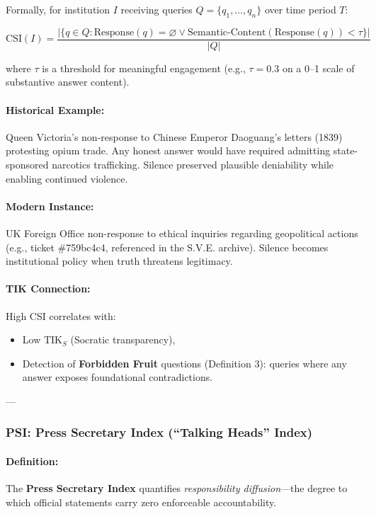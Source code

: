 \documentclass[11pt,a4paper]{article}
\theoremstyle{definition}
\theoremstyle{remark}
\begin{document}
Formally, for institution $I$ receiving queries $Q = \{q_1, \dots, q_n\}$ over time period $T$:

\[
\text{CSI}(I) = \frac{|\{q \in Q : \text{Response}(q) = \varnothing \lor \text{Semantic-Content}(\text{Response}(q)) < \tau\}|}{|Q|}
\]

where $\tau$ is a threshold for meaningful engagement (e.g., $\tau = 0.3$ on a 0–1 scale of substantive answer content).

\paragraph{Historical Example:}
Queen Victoria's non-response to Chinese Emperor Daoguang's letters (1839) protesting opium trade. Any honest answer would have required admitting state-sponsored narcotics trafficking. Silence preserved plausible deniability while enabling continued violence.

\paragraph{Modern Instance:}
UK Foreign Office non-response to ethical inquiries regarding geopolitical actions (e.g., ticket \#759bc4c4, referenced in the S.V.E. archive). Silence becomes institutional policy when truth threatens legitimacy.

\paragraph{TIK Connection:}
High CSI correlates with:
\begin{itemize}
\item Low $\text{TIK}_S$ (Socratic transparency),
\item Detection of \textbf{Forbidden Fruit} questions (Definition 3): queries where any answer exposes foundational contradictions.
\end{itemize}

---

\subsubsection{PSI: Press Secretary Index (``Talking Heads'' Index)}

\paragraph{Definition:}
The \textbf{Press Secretary Index} quantifies \textit{responsibility diffusion}—the degree to which official statements carry zero enforceable accountability.
\end{document}
